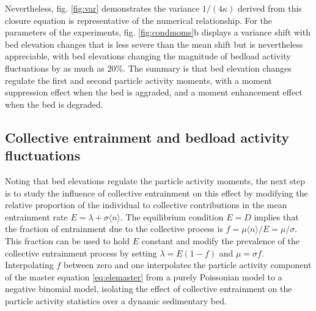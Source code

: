 Nevertheless, fig. \ref{fig:var} demonstrates the variance $1/(4\kappa)$ derived from this closure equation is representative of the numerical relationship.
For the parameters of the \citet{Ancey2008} experiments, fig. \ref{fig:condmoms}b displays a variance shift with bed elevation changes that is less severe than the mean shift but is nevertheless appreciable, with bed elevations changing the magnitude of bedload activity fluctuations by as much as 20\%.
The summary is that bed elevation changes regulate the first and second particle activity moments, with a moment suppression effect when the bed is aggraded, and a moment enhancement effect when the bed is degraded.

\subsection{Collective entrainment and bedload activity fluctuations}
\label{sec:elecolent}
Noting that bed elevations regulate the particle activity moments, the next step is to study the influence of collective entrainment on this effect by modifying the relative proportion of the individual to collective contributions in the mean entrainment rate $E=\lambda + \sigma \langle n \rangle $.
The equilibrium condition $E=D$ implies that the fraction of entrainment due to the collective process is $f = \mu\langle n \rangle/E = \mu/\sigma$. This fraction can be used to hold $E$ constant and modify the prevalence of the collective entrainment process by setting $\lambda = E(1-f)$ and $\mu= \sigma f$. Interpolating $f$ between zero and one interpolates the particle activity component of the master equation \ref{eq:elemaster} from a purely Poissonian model to a negative binomial model, isolating the effect of collective entrainment on the particle activity statistics over a dynamic sedimentary bed.
